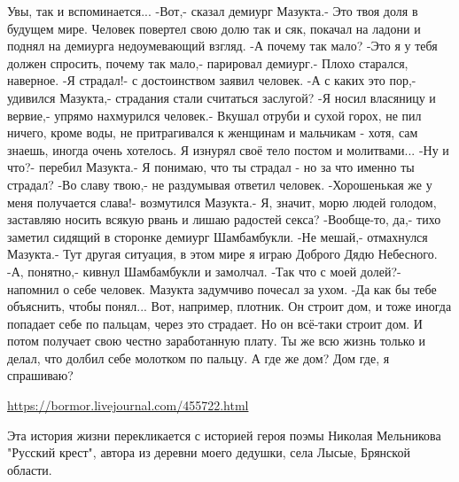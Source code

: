 \begin{itemize}
\obeycr
Увы, так и вспоминается...
-Вот,- сказал демиург Мазукта.- Это твоя доля в будущем мире.
Человек повертел свою долю так и сяк, покачал на ладони и поднял на демиурга недоумевающий взгляд.
-А почему так мало?
-Это я у тебя должен спросить, почему так мало,- парировал демиург.- Плохо старался, наверное.
-Я страдал!- с достоинством заявил человек.
-А с каких это пор,- удивился Мазукта,- страдания стали считаться заслугой?
-Я носил власяницу и вервие,- упрямо нахмурился человек.- Вкушал отруби и сухой горох, не пил ничего, кроме воды, не притрагивался к женщинам и мальчикам - хотя, сам знаешь, иногда очень хотелось. Я изнурял своё тело постом и молитвами...
-Ну и что?- перебил Мазукта.- Я понимаю, что ты страдал - но за что именно ты страдал?
-Во славу твою,- не раздумывая ответил человек.
-Хорошенькая же у меня получается слава!- возмутился Мазукта.- Я, значит, морю людей голодом, заставляю носить всякую рвань и лишаю радостей секса?
-Вообще-то, да,- тихо заметил сидящий в сторонке демиург Шамбамбукли.
-Не мешай,- отмахнулся Мазукта.- Тут другая ситуация, в этом мире я играю Доброго Дядю Небесного.
-А, понятно,- кивнул Шамбамбукли и замолчал.
-Так что с моей долей?- напомнил о себе человек.
Мазукта задумчиво почесал за ухом.
-Да как бы тебе объяснить, чтобы понял... Вот, например, плотник. Он строит дом, и тоже иногда попадает себе по пальцам, через это страдает. Но он всё-таки строит дом. И потом получает свою честно заработанную плату. Ты же всю жизнь только и делал, что долбил себе молотком по пальцу. А где же дом? Дом где, я спрашиваю?
\restorecr

\url{https://bormor.livejournal.com/455722.html}


Эта история жизни перекликается с историей героя поэмы Николая Мельникова
"Русский крест", автора из деревни моего дедушки, села Лысые, Брянской области.

\end{itemize} %
